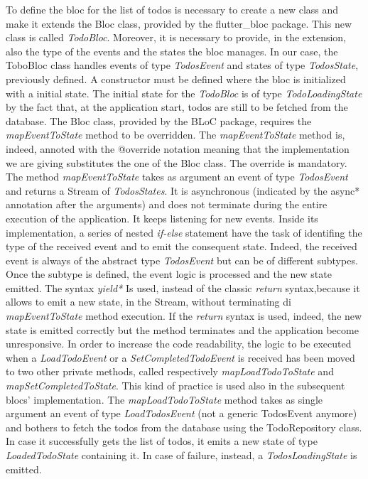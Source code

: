 To define the bloc for the list of todos is necessary to create a new class and make it extends the Bloc class, provided by the flutter\_bloc package. This new class is called \textit{TodoBloc}. Moreover, it is necessary to provide,  in the extension, also the type of the events and the states the bloc manages. In our case,  the ToboBloc class handles events of type \textit{TodosEvent} and states of type \textit{TodosState}, previously defined. A constructor must be defined where the bloc is initialized with a initial state. The initial state for the \textit{TodoBloc} is of type \textit{TodoLoadingState} by the fact that, at the application start, todos are still to be fetched from the database.
The Bloc class, provided by the BLoC package, requires the \textit{mapEventToState} method to be overridden. The \textit{mapEventToState} method is, indeed, annoted with the @override notation meaning that the implementation we are giving substitutes the one of the Bloc class. The override is mandatory. The method \textit{mapEventToState} takes as argument an event of type \textit{TodosEvent} and returns a Stream of \textit{TodosStates}. It is asynchronous (indicated by the async* annotation after the arguments) and does not terminate during the entire execution of the application. It keeps listening for new events. Inside its implementation,  a series of nested \textit{if-else }statement have the task of identifing the type of the received event and to emit the consequent state. Indeed, the received event is always of the abstract type \textit{TodosEvent} but can be of different subtypes. Once the subtype is defined, the event logic is processed and the new state emitted.  The syntax \textit{yield*} Is used,  instead of the classic \textit{return} syntax,because it allows to emit a new state, in the Stream,  without terminating di \textit{mapEventToState} method execution. If the \textit{return} syntax is used,  indeed, the new state is emitted correctly but the method terminates and the application become unresponsive. In order to increase the code readability, the logic to be executed when a \textit{LoadTodoEvent} or a \textit{SetCompletedTodoEvent} is received has been moved to two other private methods, called respectively \textit{mapLoadTodoToState} and \textit{mapSetCompletedToState}. This kind of practice is used also in the subsequent blocs' implementation. The \textit{mapLoadTodoToState} method takes as single argument an event of type \textit{LoadTodosEvent} (not a generic TodosEvent anymore) and bothers to fetch the todos from the database using the TodoRepository class. In case it successfully gets the list of todos, it emits a new state of type \textit{LoadedTodoState} containing it. In case of failure, instead, a \textit{TodosLoadingState} is emitted.
